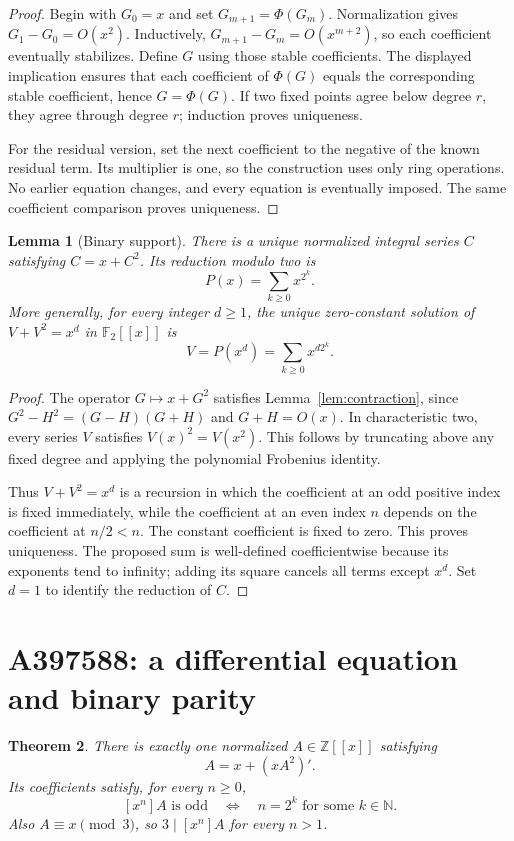 \documentclass[11pt,a4paper]{article}
\newtheorem{theorem}{Theorem}[section]
\newtheorem{lemma}[theorem]{Lemma}
\theoremstyle{remark}
\newcommand{\Z}{\mathbb Z}
\newcommand{\N}{\mathbb N}
\newcommand{\F}{\mathbb F}
\newcommand{\ps}[1]{#1[[x]]}
\begin{document}
\begin{proof}
Begin with $G_0=x$ and set $G_{m+1}=\Phi(G_m)$. Normalization gives
$G_1-G_0=O(x^2)$. Inductively,
$G_{m+1}-G_m=O(x^{m+2})$, so each coefficient eventually stabilizes.
Define $G$ using those stable coefficients. The displayed implication
ensures that each coefficient of $\Phi(G)$ equals the corresponding stable
coefficient, hence $G=\Phi(G)$. If two fixed points agree below degree
$r$, they agree through degree $r$; induction proves uniqueness.

For the residual version, set the next coefficient to the negative of the
known residual term. Its multiplier is one, so the construction uses only
ring operations. No earlier equation changes, and every equation is
eventually imposed. The same coefficient comparison proves uniqueness.
\end{proof}

\begin{lemma}[Binary support]\label{lem:binary}
There is a unique normalized integral series $C$ satisfying $C=x+C^2$.
Its reduction modulo two is
\[
 P(x)=\sum_{k\ge0}x^{2^k}.
\]
More generally, for every integer $d\ge1$, the unique zero-constant
solution of $V+V^2=x^d$ in $\ps{\F_2}$ is
\[
 V=P(x^d)=\sum_{k\ge0}x^{d2^k}.
\]
\end{lemma}

\begin{proof}
The operator $G\mapsto x+G^2$ satisfies Lemma~\ref{lem:contraction},
since $G^2-H^2=(G-H)(G+H)$ and $G+H=O(x)$. In characteristic two,
every series $V$ satisfies $V(x)^2=V(x^2)$. This follows by truncating
above any fixed degree and applying the polynomial Frobenius identity.

Thus $V+V^2=x^d$ is a recursion in which the coefficient at an odd positive
index is fixed immediately, while the coefficient at an even index $n$
depends on the coefficient at $n/2<n$. The constant coefficient is fixed
to zero. This proves uniqueness. The proposed sum is well-defined
coefficientwise because its exponents tend to infinity; adding its square
cancels all terms except $x^d$. Set $d=1$ to identify the reduction of $C$.
\end{proof}

\section{A397588: a differential equation and binary parity}

\begin{theorem}\label{thm:differential}
There is exactly one normalized $A\in\ps{\Z}$ satisfying
\begin{equation}\label{eq:differential}
 A=x+(xA^2)'.
\end{equation}
Its coefficients satisfy, for every $n\ge0$,
\[
 [x^n]A\text{ is odd}\quad\Longleftrightarrow\quad
 n=2^k\text{ for some }k\in\N.
\]
Also $A\equiv x\pmod3$, so $3\mid[x^n]A$ for every $n>1$.
\end{theorem}
\end{document}
